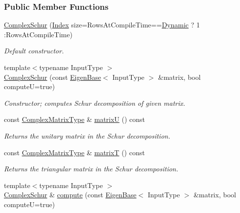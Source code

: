 \subsubsection*{Public Member Functions}
\begin{DoxyCompactItemize}
\item 
\hyperlink{group___eigenvalues___module_ad707d9978dc36b3b15e460c2a83f4093}{Complex\+Schur} (\hyperlink{group___eigenvalues___module_a652104d13723a5b1db2937866a034557}{Index} size=Rows\+At\+Compile\+Time==\hyperlink{namespace_eigen_ad81fa7195215a0ce30017dfac309f0b2}{Dynamic} ? 1 \+:Rows\+At\+Compile\+Time)
\begin{DoxyCompactList}\small\item\em Default constructor. \end{DoxyCompactList}\item 
{\footnotesize template$<$typename Input\+Type $>$ }\\\hyperlink{group___eigenvalues___module_a9c92c6e4c33890d2d063c5c8dd22777d}{Complex\+Schur} (const \hyperlink{group___core___module_struct_eigen_1_1_eigen_base}{Eigen\+Base}$<$ Input\+Type $>$ \&matrix, bool computeU=true)
\begin{DoxyCompactList}\small\item\em Constructor; computes Schur decomposition of given matrix. \end{DoxyCompactList}\item 
const \hyperlink{group___eigenvalues___module_af61fe57877d51cfb50178f78534042f0}{Complex\+Matrix\+Type} \& \hyperlink{group___eigenvalues___module_afed8177cf9836f032d42bdb6c6bc6e01}{matrixU} () const
\begin{DoxyCompactList}\small\item\em Returns the unitary matrix in the Schur decomposition. \end{DoxyCompactList}\item 
const \hyperlink{group___eigenvalues___module_af61fe57877d51cfb50178f78534042f0}{Complex\+Matrix\+Type} \& \hyperlink{group___eigenvalues___module_add3ab5ed83f7f2f06b79fa910a2d5684}{matrixT} () const
\begin{DoxyCompactList}\small\item\em Returns the triangular matrix in the Schur decomposition. \end{DoxyCompactList}\item 
{\footnotesize template$<$typename Input\+Type $>$ }\\\hyperlink{group___eigenvalues___module_class_eigen_1_1_complex_schur}{Complex\+Schur} \& \hyperlink{group___eigenvalues___module_a3543d2c286563108cd9ace672bbb1c09}{compute} (const \hyperlink{group___core___module_struct_eigen_1_1_eigen_base}{Eigen\+Base}$<$ Input\+Type $>$ \&matrix, bool computeU=true)

\end{DoxyCompactItemize}
